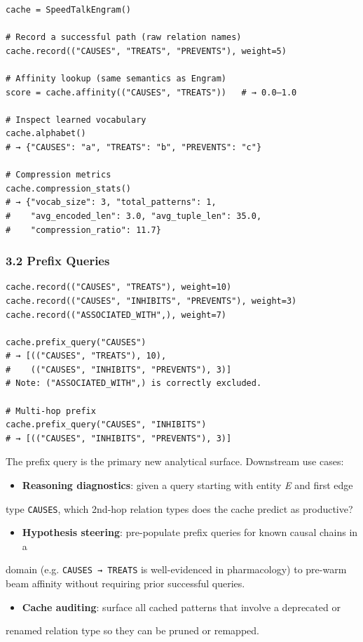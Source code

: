 \begin{lstlisting}
cache = SpeedTalkEngram()

# Record a successful path (raw relation names)
cache.record(("CAUSES", "TREATS", "PREVENTS"), weight=5)

# Affinity lookup (same semantics as Engram)
score = cache.affinity(("CAUSES", "TREATS"))   # → 0.0–1.0

# Inspect learned vocabulary
cache.alphabet()
# → {"CAUSES": "a", "TREATS": "b", "PREVENTS": "c"}

# Compression metrics
cache.compression_stats()
# → {"vocab_size": 3, "total_patterns": 1,
#    "avg_encoded_len": 3.0, "avg_tuple_len": 35.0,
#    "compression_ratio": 11.7}
\end{lstlisting}

\subsubsection{3.2 Prefix Queries}

\begin{lstlisting}
cache.record(("CAUSES", "TREATS"), weight=10)
cache.record(("CAUSES", "INHIBITS", "PREVENTS"), weight=3)
cache.record(("ASSOCIATED_WITH",), weight=7)

cache.prefix_query("CAUSES")
# → [(("CAUSES", "TREATS"), 10),
#    (("CAUSES", "INHIBITS", "PREVENTS"), 3)]
# Note: ("ASSOCIATED_WITH",) is correctly excluded.

# Multi-hop prefix
cache.prefix_query("CAUSES", "INHIBITS")
# → [(("CAUSES", "INHIBITS", "PREVENTS"), 3)]
\end{lstlisting}

The prefix query is the primary new analytical surface.  Downstream use cases:
\begin{itemize}
\item \textbf{Reasoning diagnostics}: given a query starting with entity \textit{E} and first edge
\end{itemize}
  type \texttt{CAUSES}, which 2nd-hop relation types does the cache predict as productive?
\begin{itemize}
\item \textbf{Hypothesis steering}: pre-populate prefix queries for known causal chains in a
\end{itemize}
  domain (e.g. \texttt{CAUSES → TREATS} is well-evidenced in pharm\-acology) to pre-warm
  beam affinity without requiring prior successful queries.
\begin{itemize}
\item \textbf{Cache auditing}: surface all cached patterns that involve a deprecated or
\end{itemize}
  renamed relation type so they can be pruned or remapped.

